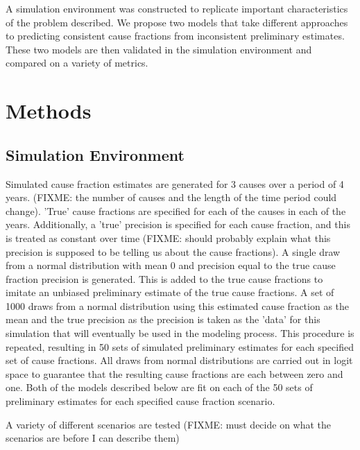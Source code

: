 \documentclass[10pt]{bmc_article}
\newenvironment{bmcformat}{\begin{raggedright}\baselineskip20pt\sloppy\setboolean{publ}{false}}{\end{raggedright}\baselineskip20pt\sloppy}
\begin{document}
\begin{bmcformat}
  A simulation environment was constructed to replicate important characteristics of 
  the problem described.  We propose two models that take different approaches to predicting 
  consistent cause fractions from inconsistent preliminary estimates.  These two models are then  
  validated in the simulation environment and compared on a variety of metrics. \pb


\section*{Methods}
  \subsection*{Simulation Environment}
     Simulated cause fraction estimates are generated for 3 causes over a period of 4 years. 
    (FIXME: the number of causes and the length of the time period could change). 'True' 
    cause fractions are specified for each of the causes in each of the years. Additionally, 
    a 'true' precision is specified for each cause fraction, and this is treated as 
    constant over time (FIXME: should probably explain what this precision is supposed to 
    be telling us about the cause fractions). A single draw from a normal distribution 
    with mean 0 and precision equal to the true cause fraction precision is generated. 
    This is added to the true cause fractions to imitate an unbiased preliminary estimate of the
    true cause fractions. A set of 1000 draws from a normal distribution using this estimated
    cause fraction as the mean and the true precision as the precision is taken as the
    'data' for this simulation that will eventually be used in the modeling process. 
    This procedure is repeated, resulting in 50 sets of simulated preliminary 
    estimates for each specified set of cause fractions. All draws from normal distributions 
    are carried out in logit space to guarantee that the resulting cause fractions are each
    between zero and one. Both of the models described below are fit on each of the 50 sets 
    of preliminary estimates for each specified cause fraction scenario. \pb

    A variety of different scenarios are tested (FIXME: must decide on what the scenarios are
    before I can describe them) \pb


\end{bmcformat}
\end{document}
